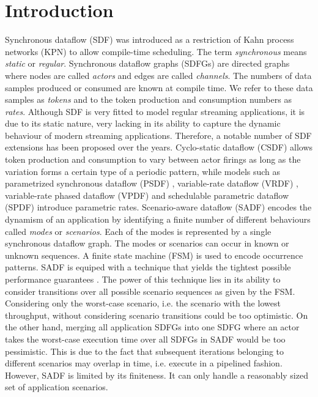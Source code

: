 \documentclass[]{eptcs}
\begin{document}
\section{Introduction}
Synchronous dataflow (SDF) \cite{2lee:all} was introduced as a restriction of Kahn process networks (KPN) \cite{2kahn} to allow compile-time scheduling. The term \textit{synchronous} means \textit{static} or \textit{regular}.
Synchronous dataflow graphs
(SDFGs) are directed graphs where nodes are called \textit{actors} and edges
are called \textit{channels}. The numbers of data samples produced or consumed are
known at compile time. We refer to these data samples as \textit{tokens} and to the
token production and consumption numbers as \textit{rates}. 
Although SDF is very fitted to model regular streaming applications, it is due to its static nature, very lacking in its ability to capture the dynamic behaviour of modern streaming applications.
Therefore, a notable number of SDF extensions has been proposed over the years. Cyclo-static dataflow (CSDF) \cite{2bil:all} allows token production and consumption to vary between actor firings as long as the variation forms a certain type of a periodic pattern, while models such as parametrized synchronous dataflow (PSDF) \cite{2bhatt:all}, variable-rate dataflow (VRDF) \cite{2wigg}, variable-rate phased dataflow (VPDF) \cite{2wigg} and schedulable parametric dataflow (SPDF) \cite{2frad:all} introduce parametric rates. Scenario-aware dataflow (SADF) \cite{2thel:all} encodes the dynamism of an application by identifying a finite number of different behaviours called \textit{modes} or \textit{scenarios}. Each of the modes is represented by a single synchronous dataflow graph. The modes or scenarios can occur in known or unknown sequences. A finite state machine (FSM) is used to encode occurrence patterns. SADF is equiped with a technique that yields the tightest possible performance guarantees \cite{2geil:all}. The power of this technique lies in its ability to consider transitions over all possible scenario sequences as given by the FSM. Considering only the worst-case scenario, i.e. the scenario with the lowest throughput, without considering scenario transitions could be too optimistic. On the other hand, merging all application SDFGs into one SDFG where an actor takes the worst-case execution time over all SDFGs in SADF would be too pessimistic. This is due to the fact that subsequent iterations belonging to different scenarios may overlap in time, i.e. execute in a pipelined fashion. However, SADF is limited by its finiteness. It can only handle a reasonably sized set of application scenarios. 
\end{document}
